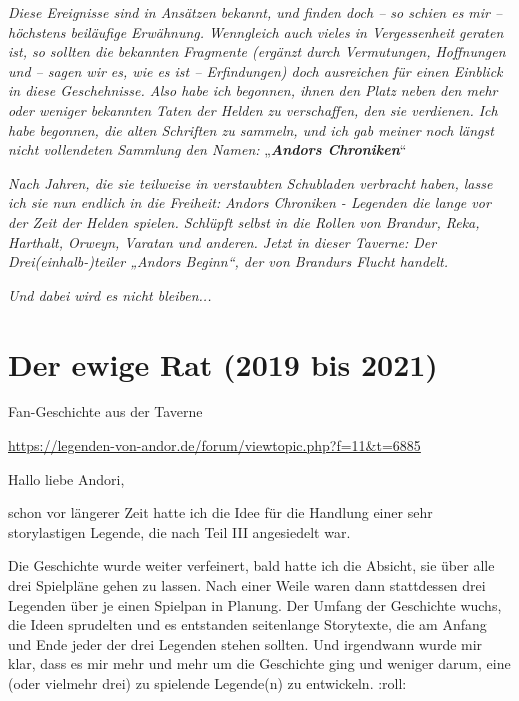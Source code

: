{

\textit{Diese Ereignisse sind in Ansätzen bekannt, und finden doch – so schien es mir – höchstens beiläufige Erwähnung. Wenngleich auch vieles in Vergessenheit geraten ist, so sollten die bekannten Fragmente (ergänzt durch Vermutungen, Hoffnungen und – sagen wir es, wie es ist – Erfindungen) doch ausreichen für einen Einblick in diese Geschehnisse. Also habe ich begonnen, ihnen den Platz neben den mehr oder weniger bekannten Taten der Helden zu verschaffen, den sie verdienen. Ich habe begonnen, die alten Schriften zu sammeln, und ich gab meiner noch längst nicht vollendeten Sammlung den Namen:} „\textit{\textbf{Andors Chroniken}}“


\textit{Nach Jahren, die sie teilweise in verstaubten Schubladen verbracht haben, lasse ich sie nun endlich in die Freiheit:}
\textit{Andors Chroniken - Legenden die lange vor der Zeit der Helden spielen. Schlüpft selbst in die Rollen von Brandur, Reka, Harthalt, Orweyn, Varatan und anderen. Jetzt in dieser Taverne: Der Drei(einhalb-)teiler „Andors Beginn“, der von Brandurs Flucht handelt.}

\textit{Und dabei wird es nicht bleiben...}






\newpage
\section{Der ewige Rat (2019 bis 2021)}

\begin{center}
    Fan-Geschichte aus der Taverne

    \url{https://legenden-von-andor.de/forum/viewtopic.php?f=11&t=6885}
\end{center}


Hallo liebe Andori,\bigskip

schon vor längerer Zeit hatte ich die Idee für die Handlung einer sehr storylastigen Legende, die nach Teil III angesiedelt war.

Die Geschichte wurde weiter verfeinert, bald hatte ich die Absicht, sie über alle drei Spielpläne gehen zu lassen. Nach einer Weile waren dann stattdessen drei Legenden über je einen Spielpan in Planung. Der Umfang der Geschichte wuchs, die Ideen sprudelten und es entstanden seitenlange Storytexte, die am Anfang und Ende jeder der drei Legenden stehen sollten. Und irgendwann wurde mir klar, dass es mir mehr und mehr um die Geschichte ging und weniger darum, eine (oder vielmehr drei) zu spielende Legende(n) zu entwickeln. :roll:

}
